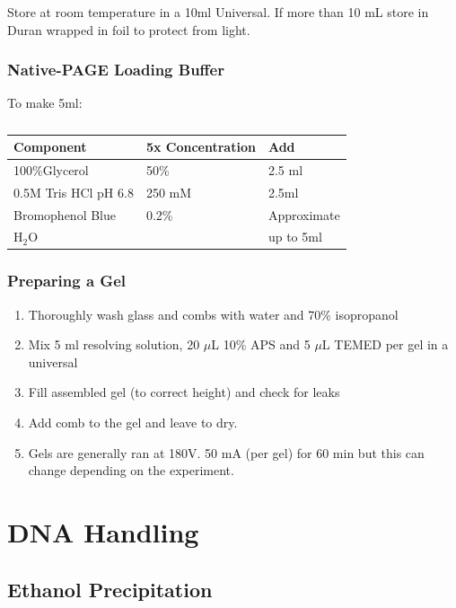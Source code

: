 \documentclass{tufte-book} %
\begin{document}
Store at room temperature in a 10ml Universal. If more than 10 mL store in Duran wrapped in foil to protect from light.


\subsection{Native-PAGE Loading Buffer}

To make 5ml:

\begin{table}[ht]
  \centering
  \selectfont
  \begin{tabular}{lll}
    \toprule
    Component & 5x Concentration & Add \\
    \midrule
   100\%Glycerol 		& 50\% 		& 2.5 ml		\\
   0.5M Tris HCl pH 6.8		& 250 mM		& 2.5ml		\\
   Bromophenol Blue		& 0.2\%		& Approximate	\\
   H$_{2}$O 			& 			& up to 5ml	\\

    \bottomrule
  \end{tabular}
  \caption{}
  \label{tab:res}
\end{table}

\newpage
\subsection{Preparing a Gel}

\begin{enumerate}
\item Thoroughly wash glass and combs with water and 70\% isopropanol
\item Mix 5 ml resolving solution, 20 $\mu$L 10\% APS and 5 $\mu$L TEMED per gel in a universal
\item Fill assembled gel (to correct height) and check for leaks
\item Add comb to the gel and leave to dry.
\item Gels are generally ran at 180V. 50 mA (per gel) for 60 min but this can change depending on the experiment.
\end{enumerate}


\chapter{DNA Handling}

\section{Ethanol Precipitation}
\end{document}
